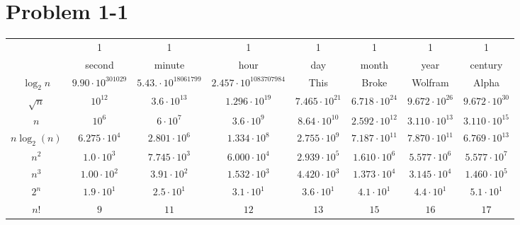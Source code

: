 \documentclass{article}
\begin{document}
\section*{Problem 1-1}

\begin{tabular}{c|c|c|c|c|c|c|c|}
	& 1 & 1 & 1 & 1 & 1 & 1 & 1 \\
	& second & minute & hour & day & month & year & century \\ \hline
	$\log_2 n$ & $9.90 \cdot 10^{301029}$ & $5.43. \cdot 10^{18061799}$ & $2.457 \cdot 10^{1083707984}$ & This & Broke & Wolfram & Alpha \\ \hline
	$\sqrt{n}$ & $10^{12}$ & $3.6 \cdot 10^{13}$ & $1.296 \cdot 10^{19}$ & $7.465 \cdot 10^{21}$ & $6.718 \cdot 10^{24}$ & $9.672 \cdot 10^{26}$ & $9.672 \cdot 10^{30}$ \\ \hline
	$n$ & $10^6$ & $6 \cdot 10^{7}$ & $3.6 \cdot 10^{9}$ & $8.64 \cdot 10^{10}$ & $2.592 \cdot 10^{12}$ & $3.110 \cdot 10^{13}$ & $3.110 \cdot 10^{15}$ \\ \hline
	$n \log_2(n)$ & $6.275 \cdot 10^{4}$ & $2.801 \cdot 10^{6}$ & $1.334 \cdot 10^{8}$ & $2.755 \cdot 10^{9}$ & $7.187 \cdot 10^{11}$ & $7.870 \cdot 10^{11}$ & $6.769 \cdot 10^{13}$ \\ \hline
	$n^2$ & $1.0 \cdot 10^3$ & $7.745 \cdot 10^3$ & $6.000 \cdot 10^4$ & $2.939 \cdot 10^5$ & $1.610 \cdot 10^6$ & $5.577 \cdot 10^6$ & $5.577 \cdot 10^7$ \\ \hline
	$n^3$ & $1.00 \cdot 10^2$ & $3.91 \cdot 10^2$ & $1.532 \cdot 10^3$ & $4.420 \cdot 10^3$ & $1.373 \cdot 10^4$ & $3.145 \cdot 10^4$ & $1.460 \cdot 10^5$ \\ \hline
	$2^n$ & $1.9 \cdot 10^1$ & $2.5 \cdot 10^1$ & $3.1 \cdot 10^1$ & $3.6 \cdot 10^1$ & $4.1 \cdot 10^1$ & $4.4 \cdot 10^1$ & $5.1 \cdot 10^1$ \\ \hline
	$n!$ & $9$ & $11$ & $12$ & $13$ & $15$ & $16$ & $17$ \\ \hline
\end{tabular}
\end{document}
